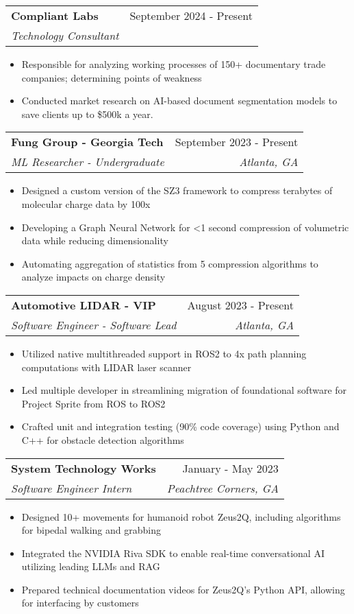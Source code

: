 \documentclass[letterpaper,10pt]{article}
\makeatletter
\newcommand{\resumeItem}[1]{
  \item\small{
    {#1 \vspace{-2pt}}
  }
}
\newcommand{\resumeSubheading}[4]{%
\vspace{-1pt}%
  \item
    \begin{tabular*}{0.97\textwidth}{l@{\extracolsep{\fill}}r}
      \textbf{#1} & #2 \\
      \textit{\small#3} & \textit{\small #4} \\

    \end{tabular*}%
  \vspace{-5pt}
}
\newcommand{\resumeItemListStart}{\begin{itemize}}
\newcommand{\resumeItemListEnd}{\end{itemize}\vspace{-5pt}}
\makeatother
\begin{document}
			\resumeSubheading
			{Compliant Labs}{September 2024 - Present}
			{Technology Consultant}{}
			\resumeItemListStart
				\resumeItem{Responsible for analyzing working processes of 150+ documentary trade companies; determining points of weakness}
				\resumeItem{Conducted market research on AI-based document segmentation models to save clients up to \$500k a year.}
			\resumeItemListEnd


			\resumeSubheading
			{Fung Group - Georgia Tech}{September 2023 - Present}
			{ML Researcher - Undergraduate}{Atlanta, GA}
			\resumeItemListStart
				\resumeItem{Designed a custom version of the SZ3 framework to compress terabytes of molecular charge data by 100x}
				\resumeItem{Developing a Graph Neural Network for \textless 1 second compression of volumetric data while reducing dimensionality}
				\resumeItem{Automating aggregation of statistics from 5 compression algorithms to analyze impacts on charge density}
			\resumeItemListEnd

			\resumeSubheading
			{Automotive LIDAR - VIP}{August 2023 - Present}
			{Software Engineer - Software Lead}{Atlanta, GA}
			\resumeItemListStart
				\resumeItem{Utilized native multithreaded support in ROS2 to 4x path planning computations with LIDAR laser scanner}
				\resumeItem{Led multiple developer in streamlining migration of foundational software for Project Sprite from ROS to ROS2}
				\resumeItem{Crafted unit and integration testing (90\% code coverage) using Python and C++ for obstacle detection algorithms}
			\resumeItemListEnd

			\resumeSubheading
			{System Technology Works}{January - May 2023}
			{Software Engineer Intern}{Peachtree Corners, GA}
			\resumeItemListStart
				\resumeItem{Designed 10+ movements for humanoid robot Zeus2Q, including algorithms for bipedal walking and grabbing}
				\resumeItem{Integrated the NVIDIA Riva SDK to enable real-time conversational AI utilizing leading LLMs and RAG}
				\resumeItem{Prepared technical documentation videos for Zeus2Q's Python API, allowing for interfacing by customers}
			\resumeItemListEnd
\end{document}
